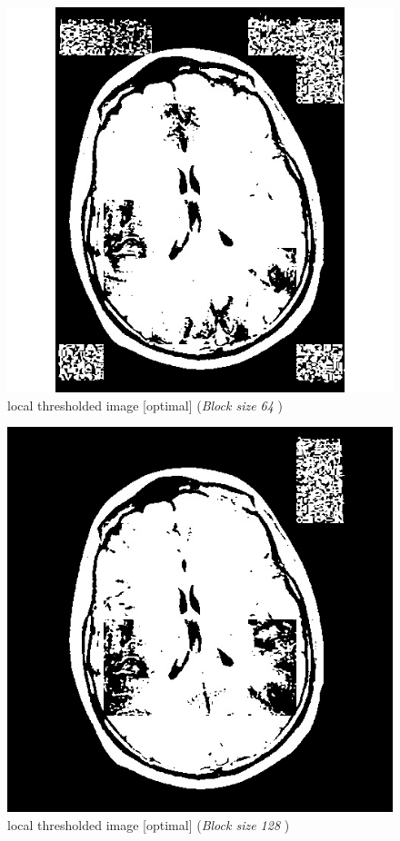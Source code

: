 \documentclass[letterpaper, 12 pt, conference ,onecolumn]{ieeeconf}  %
\begin{document}
\begin{figure}[h!]
\includegraphics[width=0.4\paperwidth]{optimal-thresholding/local/MRI-local-threshold64.jpg}
\centering
\caption{local thresholded image [optimal] (\textit{Block size 64 }) }
\label{fig:MRI-local-threshold64}
\end{figure}


\begin{figure}[h!]
\includegraphics[width=0.4\paperwidth]{optimal-thresholding/local/MRI-local-threshold128.jpg}
\centering
\caption{local thresholded image [optimal] (\textit{Block size 128 }) }
\label{fig:MRI-local-threshold128}
\end{figure}
 
\end{document}
